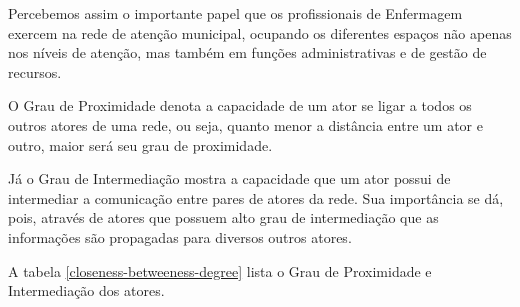 Percebemos assim o importante papel que os profissionais de Enfermagem exercem na rede de atenção municipal, ocupando os diferentes espaços não apenas nos níveis de atenção, mas também em funções administrativas e de gestão de recursos. 

O Grau de Proximidade denota a capacidade de um ator se ligar a todos os outros atores de uma rede, ou seja, quanto menor a distância entre um ator e outro, maior será seu grau de proximidade. 

Já o Grau de Intermediação mostra a capacidade que um ator possui de intermediar a comunicação entre pares de atores da rede. Sua importância se dá, pois, através de atores que possuem alto grau de intermediação que as informações são propagadas para diversos outros atores. 

A tabela \ref{closeness-betweeness-degree} lista o Grau de Proximidade e Intermediação dos atores.

